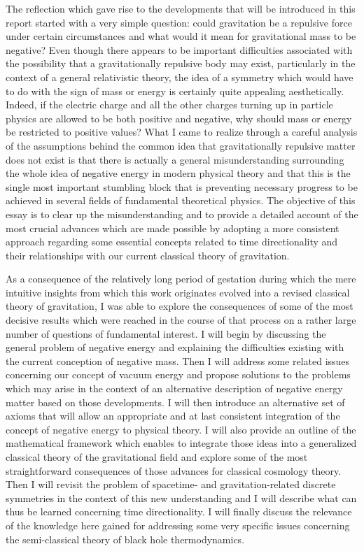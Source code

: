 \documentclass[notitlepage,12pt]{report}
\begin{document}
The reflection which gave rise to the developments that will be introduced in this report started with a very simple question: could gravitation be a repulsive force under certain circumstances and what would it mean for gravitational mass to be negative? Even though there appears to be important difficulties associated with the possibility that a gravitationally repulsive body may exist, particularly in the context of a general relativistic theory, the idea of a symmetry which would have to do with the sign of mass or energy is certainly quite appealing aesthetically. Indeed, if the electric charge and all the other charges turning up in particle physics are allowed to be both positive and negative, why should mass or energy be restricted to positive values? What I came to realize through a careful analysis of the assumptions behind the common idea that gravitationally repulsive matter does not exist is that there is actually a general misunderstanding surrounding the whole idea of negative energy in modern physical theory and that this is the single most important stumbling block that is preventing necessary progress to be achieved in several fields of fundamental theoretical physics. The objective of this essay is to clear up the misunderstanding and to provide a detailed account of the most crucial advances which are made possible by adopting a more consistent approach regarding some essential concepts related to time directionality and their relationships with our current classical theory of gravitation.

As a consequence of the relatively long period of gestation during which the mere intuitive insights from which this work originates evolved into a revised classical theory of gravitation, I was able to explore the consequences of some of the most decisive results which were reached in the course of that process on a rather large number of questions of fundamental interest. I will begin by discussing the general problem of negative energy and explaining the difficulties existing with the current conception of negative mass. Then I will address some related issues concerning our concept of vacuum energy and propose solutions to the problems which may arise in the context of an alternative description of negative energy matter based on those developments. I will then introduce an alternative set of axioms that will allow an appropriate and at last consistent integration of the concept of negative energy to physical theory. I will also provide an outline of the mathematical framework which enables to integrate those ideas into a generalized classical theory of the gravitational field and explore some of the most straightforward consequences of those advances for classical cosmology theory. Then I will revisit the problem of spacetime- and gravitation-related discrete symmetries in the context of this new understanding and I will describe what can thus be learned concerning time directionality. I will finally discuss the relevance of the knowledge here gained for addressing some very specific issues concerning the semi-classical theory of black hole thermodynamics.
\end{document}
